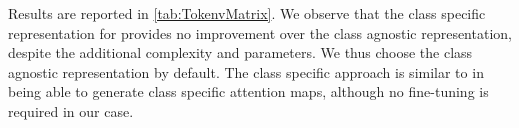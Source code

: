 Results are reported in \autoref{tab:TokenvMatrix}. We observe that the class specific 
representation for \Ours provides no improvement over the class agnostic representation, despite 
the additional complexity and parameters. We thus choose the class agnostic representation by 
default. The class specific approach is similar to \autocite{touvron2021augmenting} in being able to 
generate class specific attention maps, although no fine-tuning is required in our case. 

